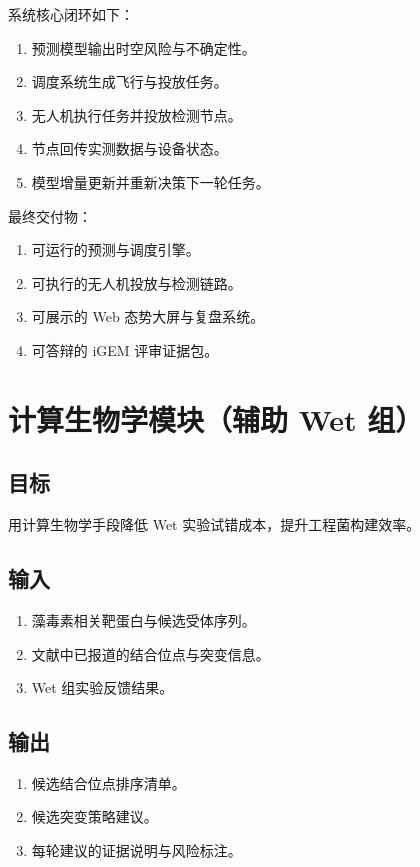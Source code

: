 \documentclass[12pt,a4paper,openany]{ctexrep}
\begin{document}
系统核心闭环如下：
\begin{enumerate}
\item 预测模型输出时空风险与不确定性。
\item 调度系统生成飞行与投放任务。
\item 无人机执行任务并投放检测节点。
\item 节点回传实测数据与设备状态。
\item 模型增量更新并重新决策下一轮任务。
\end{enumerate}

最终交付物：
\begin{enumerate}
\item 可运行的预测与调度引擎。
\item 可执行的无人机投放与检测链路。
\item 可展示的 Web 态势大屏与复盘系统。
\item 可答辩的 iGEM 评审证据包。
\end{enumerate}

\chapter{计算生物学模块（辅助 Wet 组）}

\section{目标}

用计算生物学手段降低 Wet 实验试错成本，提升工程菌构建效率。

\section{输入}

\begin{enumerate}
\item 藻毒素相关靶蛋白与候选受体序列。
\item 文献中已报道的结合位点与突变信息。
\item Wet 组实验反馈结果。
\end{enumerate}

\section{输出}

\begin{enumerate}
\item 候选结合位点排序清单。
\item 候选突变策略建议。
\item 每轮建议的证据说明与风险标注。
\end{enumerate}
\end{document}
